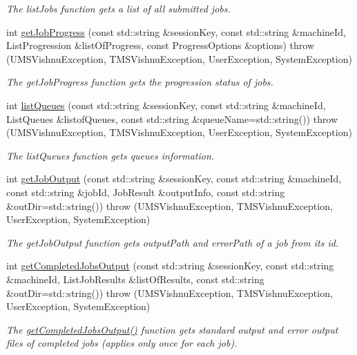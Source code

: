\begin{DoxyCompactItemize}
\begin{DoxyCompactList}\small\item\em The listJobs function gets a list of all submitted jobs. \item\end{DoxyCompactList}\item 
int \hyperlink{namespacevishnu_a6cfe834ba44e65437afa5c324ef03fd3}{getJobProgress} (const std::string \&sessionKey, const std::string \&machineId, ListProgression \&listOfProgress, const ProgressOptions \&options)  throw (UMSVishnuException, TMSVishnuException, UserException, SystemException)
\begin{DoxyCompactList}\small\item\em The getJobProgress function gets the progression status of jobs. \item\end{DoxyCompactList}\item 
int \hyperlink{namespacevishnu_ada2d98155cffa475261261fb33f7e873}{listQueues} (const std::string \&sessionKey, const std::string \&machineId, ListQueues \&listofQueues, const std::string \&queueName=std::string())  throw (UMSVishnuException, TMSVishnuException, UserException, SystemException)
\begin{DoxyCompactList}\small\item\em The listQueues function gets queues information. \item\end{DoxyCompactList}\item 
int \hyperlink{namespacevishnu_a6e0b3df33a91bd16cdadf3ac428fcf0e}{getJobOutput} (const std::string \&sessionKey, const std::string \&machineId, const std::string \&jobId, JobResult \&outputInfo, const std::string \&outDir=std::string())  throw (UMSVishnuException, TMSVishnuException, UserException, SystemException)
\begin{DoxyCompactList}\small\item\em The getJobOutput function gets outputPath and errorPath of a job from its id. \item\end{DoxyCompactList}\item 
int \hyperlink{namespacevishnu_aaedc4b5676f0c8e47f333316cff0b0a8}{getCompletedJobsOutput} (const std::string \&sessionKey, const std::string \&machineId, ListJobResults \&listOfResults, const std::string \&outDir=std::string())  throw (UMSVishnuException, TMSVishnuException, UserException, SystemException)
\begin{DoxyCompactList}\small\item\em The \hyperlink{namespacevishnu_aaedc4b5676f0c8e47f333316cff0b0a8}{getCompletedJobsOutput()} function gets standard output and error output files of completed jobs (applies only once for each job). \item\end{DoxyCompactList}\end{DoxyCompactItemize}
